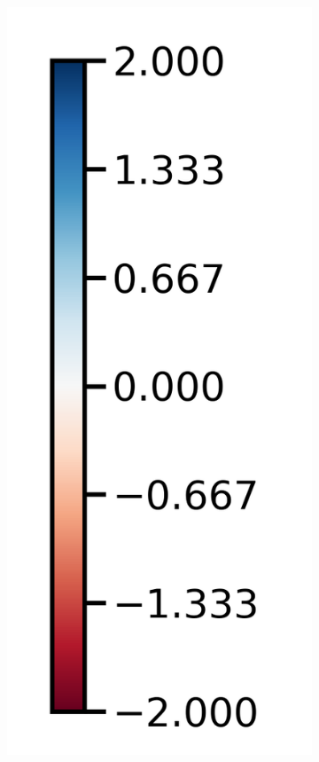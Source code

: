 \begin{figure}[t!]
\begin{center}
    \begin{subfigure}[b]{0.08\linewidth}
    \includegraphics[trim={2cm 1.5cm 2cm 0},clip,width=\textwidth]{articles/baselines/figs/simplex_plots/colorbar_vertical.png}

\end{subfigure}
\end{center}
\end{figure}
